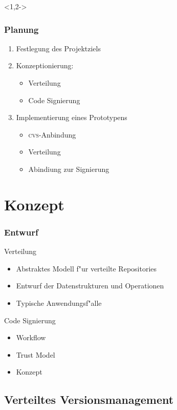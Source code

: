 \documentclass[german]{beamer}
\newcommand{\CVS}{\textsc{cvs}}
\newcommand{\HAKEN}{\ding{51}}
\begin{document}
\begin{frame}<1,2->
  \frametitle{Planung}
  \begin{enumerate}
  \item Festlegung des Projektziels \only<2>{\HAKEN}
  \item Konzeptionierung:
    \begin{itemize}
    \item Verteilung \only<2>{\HAKEN}
    \item Code Signierung \only<2>{\HAKEN}
    \end{itemize}
  \item Implementierung eines Prototypens
    \begin{itemize}
    \item \CVS{}-Anbindung
    \item Verteilung
    \item Abindiung zur Signierung
    \end{itemize}
  \end{enumerate}
\end{frame}

\section{Konzept}

\begin{frame}
  \frametitle{Entwurf}
  \begin{block}{Verteilung}
    \begin{itemize}
    \item Abstraktes Modell f"ur verteilte Repositories
    \item Entwurf der Datenstrukturen und Operationen
    \item Typische Anwendungsf"alle
    \end{itemize}
  \end{block}
  \begin{block}{Code Signierung}
    \begin{itemize}
    \item Workflow
    \item Trust Model
    \item Konzept
    \end{itemize}
  \end{block}
\end{frame}

\subsection{Verteiltes Versionsmanagement}
\newcommand{\STRUCT}[1]{\ensuremath{\mathnormal{#1}}}
\newcommand{\NORMAL}[1]{\ensuremath{\mbox{\textnormal{#1}}}}
\def\APPEND{:\mathrel\cdot}
\end{document}
